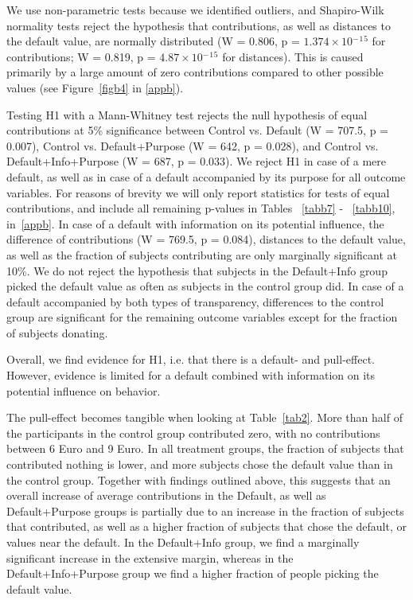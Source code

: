 \documentclass[review, authoryear,12pt]{elsarticle}
\begin{document}
We use non-parametric tests because we identified outliers, and Shapiro-Wilk normality tests reject the hypothesis that contributions, as well as distances to the default value, are normally distributed (W = 0.806, p = $1.374\times 10$$^-$$^1$$^5$ for contributions; W = 0.819, p = $4.87\times 10$$^-$$^1$$^5$ for distances). This is caused primarily by a large amount of zero contributions compared to other possible values (see Figure~\ref{figb4} in \ref{appb}).

Testing H1 with a Mann-Whitney test rejects the null hypothesis of equal contributions at 5\% significance between Control vs. Default (W = 707.5, p = 0.007), Control vs. Default+Purpose (W = 642, p = 0.028), and Control vs. Default+Info+Purpose (W = 687, p = 0.033). We reject H1 in case of a mere default, as well as in case of a default accompanied by its purpose for all outcome variables. For reasons of brevity we will only report statistics for tests of equal contributions, and include all remaining p-values in Tables ~\ref{tabb7} - ~\ref{tabb10}, in~\ref{appb}. In case of a default with information on its potential influence, the difference of contributions (W = 769.5, p = 0.084), distances to the default value, as well as the fraction of subjects contributing are only marginally significant at 10\%. We do not reject the hypothesis that subjects in the Default+Info group picked the default value as often as subjects in the control group did. In case of a default accompanied by both types of transparency, differences to the control group are significant for the remaining outcome variables except for the fraction of subjects donating.


Overall, we find evidence for H1, i.e. that there is a default- and pull-effect. However, evidence is limited for a default combined with information on its potential influence on behavior.

The pull-effect becomes tangible when looking at Table~\ref{tab2}. More than half of the participants in the control group contributed zero, with no contributions between 6 Euro and 9 Euro. In all treatment groups, the fraction of subjects that contributed nothing is lower, and more subjects chose the default value than in the control group. Together with findings outlined above, this suggests that an overall increase of average contributions in the Default, as well as Default+Purpose groups is partially due to an increase in the fraction of subjects that contributed, as well as a higher fraction of subjects that chose the default, or values near the default. In the Default+Info group, we find a marginally significant increase in the extensive margin, whereas in the Default+Info+Purpose group we find a higher fraction of people picking the default value.
\end{document}
